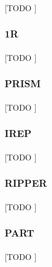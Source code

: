 \documentclass{article}
\begin{document}
			\paragraph{}
			[TODO ]

			\subsubsection{1R}
			\label{sec:1r-rule-based}

				\paragraph{}
				[TODO ]

			\subsubsection{PRISM}
			\label{sec:prism-rule-based}

				\paragraph{}
				[TODO ]

			\subsubsection{IREP}
			\label{sec:irep-rule-based}

				\paragraph{}
				[TODO ]

			\subsubsection{RIPPER}
			\label{sec:ripper-rule-based}

				\paragraph{}
				[TODO ]

			\subsubsection{PART}
			\label{sec:part-rule-based}

				\paragraph{}
				[TODO ]
\end{document}
